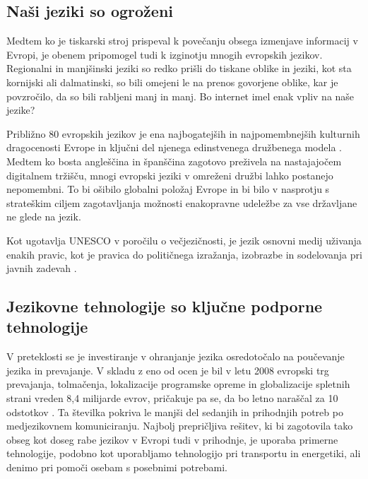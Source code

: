 \begin{multicols}{2}
\subsection{Naši jeziki so ogroženi}

Medtem ko je tiskarski stroj prispeval k povečanju obsega izmenjave informacij v Evropi, je obenem pripomogel tudi k izginotju mnogih evropskih jezikov. Regionalni in manjšinski jeziki so redko prišli do tiskane oblike in jeziki, kot sta kornijski ali dalmatinski, so bili omejeni le na prenos govorjene oblike, kar je povzročilo, da so bili rabljeni manj in manj. Bo internet imel enak vpliv na naše jezike?


Približno 80 evropskih jezikov je ena najbogatejših in najpomembnejših kulturnih dragocenosti Evrope in ključni del njenega edinstvenega družbenega modela \cite{EC2}.  Medtem ko bosta angleščina in španščina zagotovo preživela na nastajajočem digi\-talnem tržišču, mnogi evropski jeziki v omreženi družbi lahko postanejo nepomembni. To bi ošibilo globalni položaj Evrope in bi bilo v nasprotju s strateškim ciljem zagotavljanja možnosti enakopravne udeležbe za vse državljane ne glede na jezik.

 Kot ugotavlja UNESCO v poročilu o večjezičnosti, je jezik osnovni medij uživanja enakih pravic, kot je pravica do političnega izražanja, izobrazbe in sodelovanja pri javnih zadevah \cite{Unesco1}.

\subsection{Jezikovne tehnologije so ključne podporne tehnologije}

 V preteklosti se je investiranje v ohranjanje jezika osredotočalo na poučevanje jezika in prevajanje. V skladu z eno od ocen je bil v letu 2008 evropski trg prevajanja, tolmačenja, lokalizacije programske opreme in globalizacije spletnih strani vreden 8,4 milijarde evrov, pričakuje pa se, da bo letno naraščal za 10 odstotkov \cite{EC3}.  Ta številka pokriva le manjši del sedanjih in prihodnjih potreb po medjezikovnem komuniciranju. Najbolj prepričljiva rešitev, ki bi zagotovila tako obseg kot doseg rabe jezikov v Evropi tudi v prihodnje, je uporaba primerne tehnologije, podobno kot uporabljamo tehnologijo pri transportu in energetiki, ali denimo pri pomoči osebam s posebnimi potrebami.


\end{multicols}
